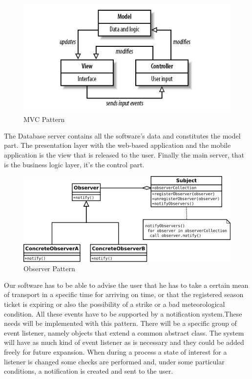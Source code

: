 
\begin{figure}[H]
	\centering
	\includegraphics[scale=0.4]{Images/Patterns/MVC_Pattern}
	\caption{MVC Pattern}
\end{figure}
The Database server contains all the software’s data and constitutes the model part. The presentation layer with the web-based application and the mobile application is the view that is released to the user. Finally the main server,  that is the business logic layer, it’s the control part.

\begin{figure}[H]
	\centering
	\includegraphics[scale=0.45]{Images/Patterns/Observer_Pattern}
	\caption{Observer Pattern}
\end{figure}
Our software has to be able to advise the user that he has to take a certain mean of transport in a specific time for arriving on time, or that the registered season ticket is expiring or also the possibility of a strike or a bad meteorological condition. All these events have to be supported by a notification system.These needs will be implemented with this pattern.  There will be a specific group of event listener, namely objects that extend a common abstract class. The system will have as much kind of event listener as is necessary and they could be added freely for future expansion. When during a process a state of interest for a listener is changed some checks are performed and, under some particular conditions, a notification is created and sent to the user. 


